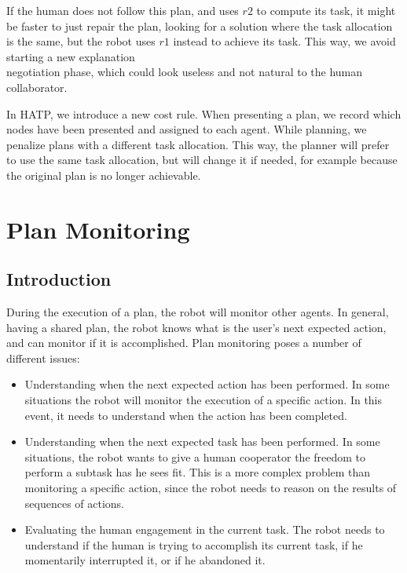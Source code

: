 If the human does not follow this plan, and uses $r2$ to compute its task,  it might be faster to just repair the plan, looking for a solution where the task allocation is the same, but the robot uses $r1$ instead to achieve its task. This way, we avoid starting a new explanation\\negotiation phase, which could look useless and not natural to the human collaborator.


In HATP, we introduce a new cost rule. When presenting a plan, we record which nodes have been presented and assigned to each agent. While planning, we penalize plans with a different task allocation. This way, the planner will prefer to use the same task allocation, but will change it if needed, for example because the original plan is no longer achievable.



\section{Plan Monitoring}
\label{section:plan_management-plan_monitoring}

\subsection{Introduction}
During the execution of a plan, the robot will monitor other agents. In general, having a shared plan, the robot knows what is the user's next expected action, and can monitor if it is accomplished. Plan monitoring poses a number of different issues:
\begin{itemize}
\item Understanding when the next expected action has been performed. In some situations the robot will monitor the execution of a specific action. In this event, it needs to understand when the action has been completed.
\item Understanding when the next expected task has been performed. In some situations, the robot wants to give a human cooperator the freedom to perform a subtask has he sees fit. This is a more complex problem than monitoring a specific action, since the robot needs to reason on the results of sequences of actions.
\item Evaluating the human engagement in the current task. The robot needs to understand if the human is trying to accomplish its current task, if he momentarily interrupted it, or if he abandoned it.
\end{itemize}

